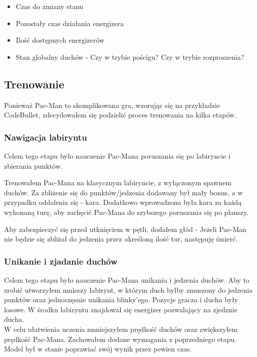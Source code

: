 \documentclass[12pt, draft]{report}
\begin{document}
\begin{itemize}
    \item Czas do zmiany stanu
    \item Pozostały czas działania energizera
    \item Ilość dostępnych energizerów
    \item Stan globalny duchów - Czy w trybie pościgu? Czy w trybie rozproszenia?
\end{itemize}

\subsection{Trenowanie}
Ponieważ Pac-Man to skomplikowana gra, wzorując się na przykładzie CodeBullet\cite{CBPacman}, zdecydowałem się podzielić proces trenowania na kilka etapów.

\subsubsection{Nawigacja labiryntu}
Celem tego etapu było nauczenie Pac-Mana poruszania się po labiryncie i zbierania punktów.

Trenowałem Pac-Mana na klasycznym labiryncie, z wyłączonym spawnem duchów. Za zbliżenie się do punktów/jedzenia dodawany był mały bonus, a w przypadku oddalenia się - kara. Dodatkowo wprowadzona była kara za każdą wykonaną turę, aby zachęcić Pac-Mana do szybszego poruszania się po planszy.

Aby zabezpieczyć się przed utknięciem w pętli, dodałem głód - Jeżeli Pac-Man nie będzie się zbliżał do jedzenia przez określoną ilość tur, następuję śmierć.

\subsubsection{Unikanie i zjadanie duchów}
Celem tego etapu było nauczenie Pac-Mana unikania i jedzenia duchów. Aby to zrobić utworzyłem mnieszy labirynt, w którym duch byłby zmuszony do jedzenia punktów oraz jednoczęsnie unikania blinky'ego. 
Pozycje gracza i ducha były losowe. W środku labiryntu znajdował się energizer pozwalający na zjedznie ducha. \\
W celu ułatwienia uczenia zmniejszyłem prędkość duchów oraz zwiększyłem prędkość Pac-Mana. Zachowałem dodane wymagania z poprzedniego etapu.
Model był w stanie poprawiać swój wynik przez pewien czas.
\end{document}
